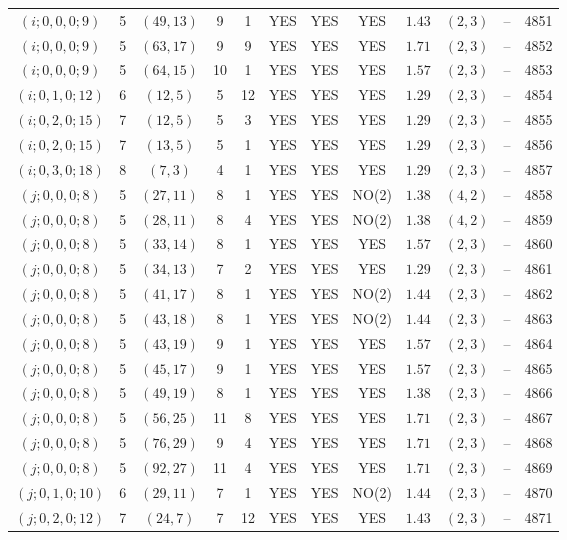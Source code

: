 \begin{longtable}{|c|c|c|c|c|c|c|c|c|c|c|c|}
$(i;0,0,0;9)$ & 5 & $(49,13)$ & 9 & 1 & YES & YES & YES & $1.43$ & $(2,3)$ & -- & 4851\\
$(i;0,0,0;9)$ & 5 & $(63,17)$ & 9 & 9 & YES & YES & YES & $1.71$ & $(2,3)$ & -- & 4852\\
$(i;0,0,0;9)$ & 5 & $(64,15)$ & 10 & 1 & YES & YES & YES & $1.57$ & $(2,3)$ & -- & 4853\\
$(i;0,1,0;12)$ & 6 & $(12,5)$ & 5 & 12 & YES & YES & YES & $1.29$ & $(2,3)$ & -- & 4854\\
$(i;0,2,0;15)$ & 7 & $(12,5)$ & 5 & 3 & YES & YES & YES & $1.29$ & $(2,3)$ & -- & 4855\\
$(i;0,2,0;15)$ & 7 & $(13,5)$ & 5 & 1 & YES & YES & YES & $1.29$ & $(2,3)$ & -- & 4856\\
$(i;0,3,0;18)$ & 8 & $(7,3)$ & 4 & 1 & YES & YES & YES & $1.29$ & $(2,3)$ & -- & 4857\\
$(j;0,0,0;8)$ & 5 & $(27,11)$ & 8 & 1 & YES & YES & NO(2) & $1.38$ & $(4,2)$ & -- & 4858\\
$(j;0,0,0;8)$ & 5 & $(28,11)$ & 8 & 4 & YES & YES & NO(2) & $1.38$ & $(4,2)$ & -- & 4859\\
$(j;0,0,0;8)$ & 5 & $(33,14)$ & 8 & 1 & YES & YES & YES & $1.57$ & $(2,3)$ & -- & 4860\\
$(j;0,0,0;8)$ & 5 & $(34,13)$ & 7 & 2 & YES & YES & YES & $1.29$ & $(2,3)$ & -- & 4861\\
$(j;0,0,0;8)$ & 5 & $(41,17)$ & 8 & 1 & YES & YES & NO(2) & $1.44$ & $(2,3)$ & -- & 4862\\
$(j;0,0,0;8)$ & 5 & $(43,18)$ & 8 & 1 & YES & YES & NO(2) & $1.44$ & $(2,3)$ & -- & 4863\\
$(j;0,0,0;8)$ & 5 & $(43,19)$ & 9 & 1 & YES & YES & YES & $1.57$ & $(2,3)$ & -- & 4864\\
$(j;0,0,0;8)$ & 5 & $(45,17)$ & 9 & 1 & YES & YES & YES & $1.57$ & $(2,3)$ & -- & 4865\\
$(j;0,0,0;8)$ & 5 & $(49,19)$ & 8 & 1 & YES & YES & YES & $1.38$ & $(2,3)$ & -- & 4866\\
$(j;0,0,0;8)$ & 5 & $(56,25)$ & 11 & 8 & YES & YES & YES & $1.71$ & $(2,3)$ & -- & 4867\\
$(j;0,0,0;8)$ & 5 & $(76,29)$ & 9 & 4 & YES & YES & YES & $1.71$ & $(2,3)$ & -- & 4868\\
$(j;0,0,0;8)$ & 5 & $(92,27)$ & 11 & 4 & YES & YES & YES & $1.71$ & $(2,3)$ & -- & 4869\\
$(j;0,1,0;10)$ & 6 & $(29,11)$ & 7 & 1 & YES & YES & NO(2) & $1.44$ & $(2,3)$ & -- & 4870\\
$(j;0,2,0;12)$ & 7 & $(24,7)$ & 7 & 12 & YES & YES & YES & $1.43$ & $(2,3)$ & -- & 4871
\end{longtable}
